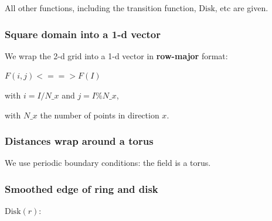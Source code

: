 All other functions, including the transition function, $\mathrm{Disk}$,
etc are given.

\subsubsection{Square domain into a 1-d
vector}\label{square-domain-into-a-1-d-vector}

We wrap the 2-d grid into a 1-d vector in \textbf{row-major} format:

$F(i, j) <==> F(I)$

with $i = I / {N\_x}$ and $j = I \% {N\_x}$,

with $N\_x$ the number of points in direction $x$.

\subsubsection{Distances wrap around a
torus}\label{distances-wrap-around-a-torus}

We use periodic boundary conditions: the field is a torus.

\begin{Shaded}
\end{Shaded}

\subsubsection{Smoothed edge of ring and
disk}\label{smoothed-edge-of-ring-and-disk}

$\mathrm{Disk}(r)$:

\begin{Shaded}
\begin{Highlighting}[]

  \NormalTok{\{}
  \NormalTok{)}
     \NormalTok{;}
  \NormalTok{)}
     \NormalTok{;}
    
\NormalTok{\}}
\end{Highlighting}
\end{Shaded}


